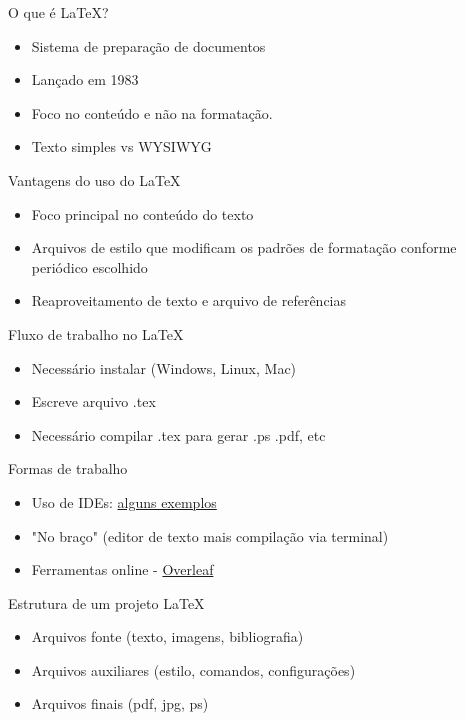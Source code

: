 \documentclass[aspectratio=169,xcolor=dvipsnames]{beamer}
\begin{document}
\begin{frame}{O que é \LaTeX?}
    \begin{itemize}
        \item Sistema de preparação de documentos 
        \item Lançado em 1983
        \item Foco no conteúdo e não na formatação. 
        \item Texto simples vs WYSIWYG  
    \end{itemize}
\end{frame}

\begin{frame}{Vantagens do uso do \LaTeX}
    \begin{itemize}
        \item Foco principal no conteúdo do texto
        \item Arquivos de estilo que modificam os padrões de formatação conforme periódico escolhido
        \item Reaproveitamento de texto e arquivo de referências 
    \end{itemize}
        
\end{frame}

\begin{frame}{Fluxo de trabalho no \LaTeX}
    \begin{itemize}
        \item Necessário instalar (Windows, Linux, Mac)
        \item Escreve arquivo .tex 
        \item Necessário compilar .tex para gerar .ps .pdf, etc
    \end{itemize}
\end{frame}

\begin{frame}{Formas de trabalho}
    \begin{itemize}
        \item Uso de IDEs: \href{https://beebom.com/best-latex-editors/}{alguns exemplos}
        \item "No braço" (editor de texto mais compilação via terminal)
        \item Ferramentas online - \href{http://www.overleaf.com/}{Overleaf}
    \end{itemize}
\end{frame}

\begin{frame}{Estrutura de um projeto \LaTeX }
    \begin{itemize}
        \item Arquivos fonte (texto, imagens, bibliografia)
        \item Arquivos auxiliares (estilo, comandos, configurações)
        \item Arquivos finais (pdf, jpg, ps)
    \end{itemize}
\end{frame}
\end{document}
